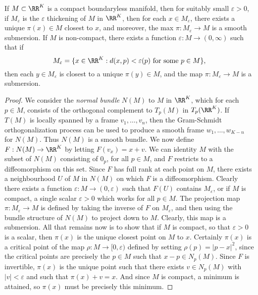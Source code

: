 \begin{lemma}
    If $M \subset \RR^K$ is a compact boundaryless manifold, then for suitably small $\varepsilon > 0$, if $M_\varepsilon$ is the $\varepsilon$ thickening of $M$ in $\RR^K$, then for each $x \in M_\varepsilon$, there exists a unique $\pi(x) \in M$ closest to $x$, and moreover, the max $\pi: M_\varepsilon \to M$ is a smooth submersion. If $M$ is non-compact, there exists a function $\varepsilon: M \to (0,\infty)$ such that if
    \[ M_\varepsilon = \{ x \in \RR^K: d(x,p) < \varepsilon(p)\ \text{for some $p \in M$} \}, \]
    then each $y \in M_\varepsilon$ is closest to a unique $\pi(y) \in M$, and the map $\pi: M_\varepsilon \to M$ is a submersion.
\end{lemma}
\begin{proof}
    We consider the \emph{normal bundle} $N(M)$ to $M$ in $\RR^K$, which for each $p \in M$, consists of the orthogonal complement to $T_p(M)$ in $T_p(\RR^K)$. If $T(M)$ is locally spanned by a frame $v_1, \dots, v_n$, then the Gram-Schmidt orthogonalization process can be used to produce a smooth frame $w_1, \dots, w_{K-n}$ for $N(M)$. Thus $N(M)$ is a smooth bundle. We now define $F: N(M) \to \RR^K$ by letting $F(v_x) = x + v$. We can identity $M$ with the subset of $N(M)$ consisting of $0_p$, for all $p \in M$, and $F$ restricts to a diffeomorphism on this set. Since $F$ has full rank at each point on $M$, there exists a neighbourhood $U$ of $M$ in $N(M)$ on which $F$ is a diffeomorphism. Clearly there exists a function $\varepsilon: M \to (0,\varepsilon)$ such that $F(U)$ contains $M_\varepsilon$, or if $M$ is compact, a single scalar $\varepsilon > 0$ which works for all $p \in M$. The projection map $\pi: M_\varepsilon \to M$ is defined by taking the inverse of $F$ on $M_\varepsilon$, and then using the bundle structure of $N(M)$ to project down to $M$. Clearly, this map is a submersion. All that remains now is to show that if $M$ is compact, so that $\varepsilon > 0$ is a scalar, then $\pi(x)$ is the unique closest point on $M$ to $x$. Certainly $\pi(x)$ is a critical point of the map $\rho: M \to [0,\varepsilon)$ defined by setting $\rho(p) = |p - x|^2$, since the critical points are precisely the $p \in M$ such that $x - p \in N_p(M)$. Since $F$ is invertible, $\pi(x)$ is the unique point such that there exists $v \in N_p(M)$ with $|v| < \varepsilon$ and such that $\pi(x) + v = x$. And since $M$ is compact, a minimum is attained, so $\pi(x)$ must be precisely this minimum.
\end{proof}

